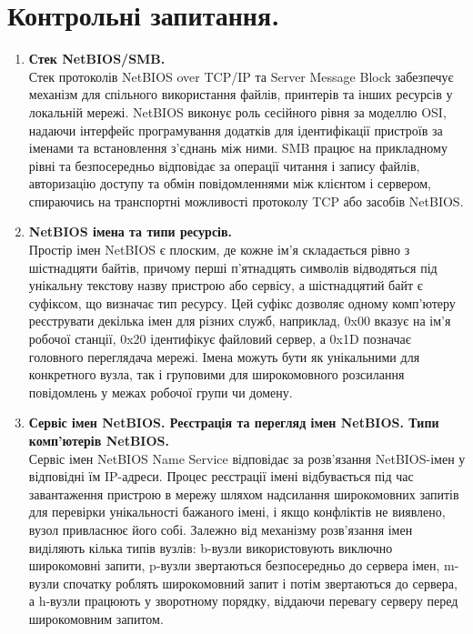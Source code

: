 \documentclass[14pt, a4paper]{extreport}
\begin{document}
	\section*{Контрольні запитання.}
	
	\begin{enumerate}
		\item \textbf{Стек NetBIOS/SMB.} \\ Стек протоколів NetBIOS over TCP/IP та Server Message Block забезпечує механізм для спільного використання файлів, принтерів та інших ресурсів у локальній мережі. NetBIOS виконує роль сесійного рівня за моделлю OSI, надаючи інтерфейс програмування додатків для ідентифікації пристроїв за іменами та встановлення з'єднань між ними. SMB працює на прикладному рівні та безпосередньо відповідає за операції читання і запису файлів, авторизацію доступу та обмін повідомленнями між клієнтом і сервером, спираючись на транспортні можливості протоколу TCP або засобів NetBIOS.
		
		\item \textbf{NetBIOS імена та типи ресурсів.} \\ Простір імен NetBIOS є плоским, де кожне ім'я складається рівно з шістнадцяти байтів, причому перші п'ятнадцять символів відводяться під унікальну текстову назву пристрою або сервісу, а шістнадцятий байт є суфіксом, що визначає тип ресурсу. Цей суфікс дозволяє одному комп'ютеру реєструвати декілька імен для різних служб, наприклад, 0x00 вказує на ім'я робочої станції, 0x20 ідентифікує файловий сервер, а 0x1D позначає головного переглядача мережі. Імена можуть бути як унікальними для конкретного вузла, так і груповими для широкомовного розсилання повідомлень у межах робочої групи чи домену.
		
		\item \textbf{Сервіс імен NetBIOS. Реєстрація та перегляд імен NetBIOS. Типи комп'ютерів NetBIOS.} \\ Сервіс імен NetBIOS Name Service відповідає за розв'язання NetBIOS-імен у відповідні їм IP-адреси. Процес реєстрації імені відбувається під час завантаження пристрою в мережу шляхом надсилання широкомовних запитів для перевірки унікальності бажаного імені, і якщо конфліктів не виявлено, вузол привласнює його собі. Залежно від механізму розв'язання імен виділяють кілька типів вузлів: b-вузли використовують виключно широкомовні запити, p-вузли звертаються безпосередньо до сервера імен, m-вузли спочатку роблять широкомовний запит і потім звертаються до сервера, а h-вузли працюють у зворотному порядку, віддаючи перевагу серверу перед широкомовним запитом.
		

\end{enumerate}
\end{document}
